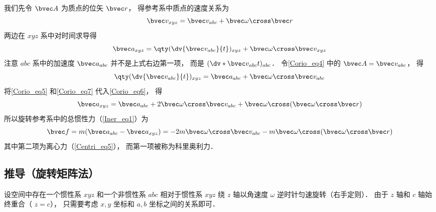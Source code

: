 我们先令 $\bvec A$ 为质点的位矢 $\bvec r$， 得参考系中质点的速度关系为
\begin{equation}\label{Corio_eq5}
\bvec v_{xyz} = \bvec v_{abc} + \bvec\omega\cross\bvec r
\end{equation}
两边在 $xyz$ 系中对时间求导得
\begin{equation}\label{Corio_eq6}
\bvec a_{xyz} = \qty(\dv{\bvec v_{abc}}{t})_{xyz} + \bvec\omega\cross\bvec v_{xyz}
\end{equation}
注意 $abc$ 系中的加速度 $\bvec a_{abc}$ 并不是上式右边第一项， 而是 $(\dv*{\bvec v_{abc}}{t})_{abc}$． 令\autoref{Corio_eq4} 中的 $\bvec A = \bvec v_{abc}$， 得
\begin{equation}\label{Corio_eq7}
\qty(\dv{\bvec v_{abc}}{t})_{xyz} = \bvec a_{abc} + \bvec\omega\cross\bvec v_{abc}
\end{equation}
将\autoref{Corio_eq5} 和\autoref{Corio_eq7} 代入\autoref{Corio_eq6}， 得
\begin{equation}
\bvec a_{xyz} = \bvec a_{abc} + 2\bvec\omega\cross\bvec v_{abc} + \bvec\omega\cross(\bvec\omega\cross\bvec r)
\end{equation}
所以旋转参考系中的总惯性力（\autoref{Iner_eq1}）为
\begin{equation}
\bvec f = m(\bvec a_{abc} - \bvec a_{xyz}) = -2m\bvec\omega\cross\bvec v_{abc} - m\bvec\omega\cross(\bvec\omega\cross\bvec r)
\end{equation}
其中第二项为离心力（\autoref{Centri_eq5}）， 而第一项被称为科里奥利力．

\subsection{推导（旋转矩阵法）}
设空间中存在一个惯性系 $xyz$ 和一个非惯性系 $abc$ 相对于惯性系 $xyz$ 绕 $z$ 轴以角速度 $\omega$ 逆时针匀速旋转（右手定则）． 由于 $z$ 轴和 $c$ 轴始终重合（ $z=c$）， 只需要考虑 $x,y$ 坐标和 $a,b$ 坐标之间的关系即可．

